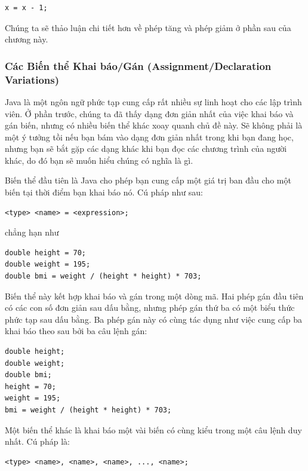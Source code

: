 \begin{verbatim}
x = x - 1;
\end{verbatim}

Chúng ta sẽ thảo luận chi tiết hơn về phép tăng và phép giảm ở phần sau
của chương này.

\subsubsection{Các Biến thể Khai báo/Gán (Assignment/Declaration
Variations)}\label{cuxe1c-biux1ebfn-thux1ec3-khai-buxe1oguxe1n-assignmentdeclaration-variations}

Java là một ngôn ngữ phức tạp cung cấp rất nhiều sự linh hoạt cho các
lập trình viên. Ở phần trước, chúng ta đã thấy dạng đơn giản nhất của
việc khai báo và gán biến, nhưng có nhiều biến thể khác xoay quanh chủ
đề này. Sẽ không phải là một ý tưởng tồi nếu bạn bám vào dạng đơn giản
nhất trong khi bạn đang học, nhưng bạn sẽ bắt gặp các dạng khác khi bạn
đọc các chương trình của người khác, do đó bạn sẽ muốn hiểu chúng có
nghĩa là gì.

Biến thể đầu tiên là Java cho phép bạn cung cấp một giá trị ban đầu cho
một biến tại thời điểm bạn khai báo nó. Cú pháp như sau:

\begin{verbatim}
<type> <name> = <expression>;
\end{verbatim}

chẳng hạn như

\begin{verbatim}
double height = 70;
double weight = 195;
double bmi = weight / (height * height) * 703;
\end{verbatim}

Biến thể này kết hợp khai báo và gán trong một dòng mã. Hai phép gán đầu
tiên có các con số đơn giản sau dấu bằng, nhưng phép gán thứ ba có một
biểu thức phức tạp sau dấu bằng. Ba phép gán này có cùng tác dụng như
việc cung cấp ba khai báo theo sau bởi ba câu lệnh gán:

\begin{verbatim}
double height;
double weight;
double bmi;
height = 70;
weight = 195;
bmi = weight / (height * height) * 703;
\end{verbatim}

Một biến thể khác là khai báo một vài biến có cùng kiểu trong một câu
lệnh duy nhất. Cú pháp là:

\begin{verbatim}
<type> <name>, <name>, <name>, ..., <name>;
\end{verbatim}

